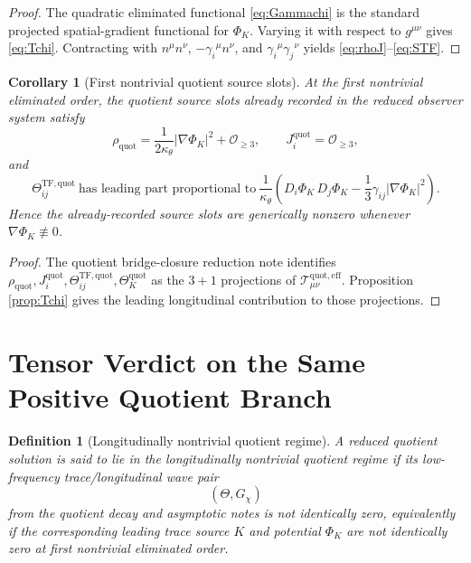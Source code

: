 \documentclass[11pt]{article}
\newcommand{\EffAux}{\mathcal T_{\mu\nu}^{\mathrm{quot,eff}}}
\newtheorem{definition}{Definition}
\newtheorem{corollary}{Corollary}
\begin{document}
\begin{proof}
The quadratic eliminated functional \eqref{eq:Gammachi} is the standard projected spatial-gradient functional for \(\Phi_K\). Varying it with respect to \(g^{\mu\nu}\) gives \eqref{eq:Tchi}. Contracting with \(n^\mu n^\nu\), \(-\gamma_i{}^\mu n^\nu\), and \(\gamma_i{}^\mu\gamma_j{}^\nu\) yields \eqref{eq:rhoJ}--\eqref{eq:STF}.
\end{proof}

\begin{corollary}[First nontrivial quotient source slots]
\label{cor:slots}
At the first nontrivial eliminated order, the quotient source slots already recorded in the reduced observer system satisfy
\begin{equation}
\rho_{\mathrm{quot}}
=
\frac{1}{2\kappa_\theta}|\nabla\Phi_K|^2+\mathcal O_{\ge 3},
\qquad
J_i^{\mathrm{quot}}
=
\mathcal O_{\ge 3},
\label{eq:slot1}
\end{equation}
and
\begin{equation}
\Theta_{ij}^{\mathrm{TF,quot}}
\ \text{has leading part proportional to}\
\frac{1}{\kappa_\theta}
\left(
D_i\Phi_K\,D_j\Phi_K
-\frac13\gamma_{ij}|\nabla\Phi_K|^2
\right).
\label{eq:slot2}
\end{equation}
Hence the already-recorded source slots are generically nonzero whenever \(\nabla\Phi_K\not\equiv 0\).
\end{corollary}

\begin{proof}
The quotient bridge-closure reduction note identifies \(\rho_{\mathrm{quot}},J_i^{\mathrm{quot}},\Theta_{ij}^{\mathrm{TF,quot}},\Theta_K^{\mathrm{quot}}\) as the \(3+1\) projections of \(\EffAux\). Proposition \ref{prop:Tchi} gives the leading longitudinal contribution to those projections.
\end{proof}

\section{Tensor Verdict on the Same Positive Quotient Branch}

\begin{definition}[Longitudinally nontrivial quotient regime]
\label{def:nontrivial}
A reduced quotient solution is said to lie in the \emph{longitudinally nontrivial quotient regime} if its low-frequency trace/longitudinal wave pair
\[
(\Theta,G_\chi)
\]
from the quotient decay and asymptotic notes is not identically zero, equivalently if the corresponding leading trace source \(K\) and potential \(\Phi_K\) are not identically zero at first nontrivial eliminated order.
\end{definition}
\end{document}
